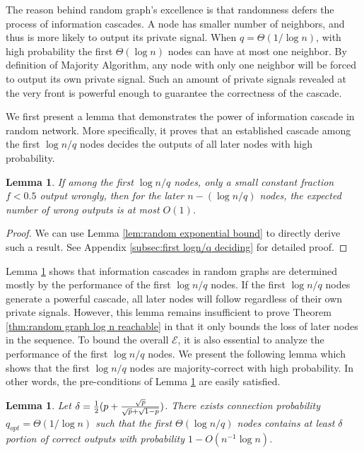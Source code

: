 \documentclass[a4paper,UKenglish]{lipics}
\newtheorem{lem}[thm]{Lemma}
\theoremstyle{definition}
\begin{document}
The reason behind random graph's excellence is that randomness defers the process of information cascades.
A node has smaller number of neighbors, and thus is more likely to output its private signal.
When $q = \Theta(1/ \log n)$, with high probability the first $\Theta(\log n)$ nodes can have at most one neighbor.
By definition of Majority Algorithm, any node with only one neighbor will be forced to output its own private signal.
Such an amount of private signals revealed at the very front is powerful enough to guarantee the correctness of the cascade.

We first present a lemma that demonstrates the power of information cascade in random network.
More specifically, it proves that an established cascade among the first $\log n / q$ nodes decides the outputs of all later nodes with high probability.

\begin{lem} \label {lem:first logn/q deciding}
If among the first $\log n/q$ nodes, 
	only a small constant fraction $f < 0.5$ output wrongly, 
	then for the later $n - (\log n/q)$ nodes, the expected number of wrong outputs is at most $O(1)$.
\end{lem}

\begin{proof}
We can use Lemma \ref{lem:random exponential bound} to directly derive such a result.
See Appendix \ref{subsec:first logn/q deciding} for detailed proof.
\end{proof}

Lemma \ref{lem:first logn/q deciding} shows that information cascades 
	in random graphs are determined mostly by the performance of the first $\log n/q$ nodes.
If the first $\log n/q$ nodes generate a powerful cascade, all later nodes will follow regardless of their own private signals.
However, this lemma remains insufficient to prove Theorem \ref{thm:random graph log n reachable}
	in that it only bounds the loss of later nodes in the sequence.
To bound the overall $\mathcal{E}$, it is also essential to analyze the performance of the first $\log n/q$ nodes.
We present the following lemma which shows that the first $\log n/q$ nodes are majority-correct with high probability.
In other words, the pre-conditions of Lemma \ref{lem:first logn/q deciding} are easily satisfied.

\begin{lem}
\label{lem:majority among first logn/q}
Let $\delta = {1\over 2}(p + {\sqrt{p}\over \sqrt{p} + \sqrt{1-p}})$.
There exists connection probability $q_{opt} = \Theta(1/\log n)$ such that the first $\Theta(\log n/q)$ nodes 
	contains at least $\delta$ portion of correct outputs with probability $1 - O(n^{-1}\log n)$.
\end{lem}
\end{document}
